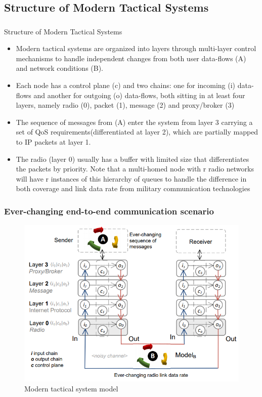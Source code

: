 \documentclass{beamer}
\begin{document}
\subsection*{Structure of Modern Tactical Systems}
\begin{frame}[fragile]
\frametitle{}
\begin{block}{Structure of Modern Tactical Systems}
\begin{itemize}
    \item Modern tactical systems are organized into layers through multi-layer control mechanisms to handle independent changes from both user data-flows (A) and network conditions (B).
    \item  Each node has a control plane (c) and two chains: one for incoming (i) data-flows and another for outgoing (o) data-flows, both sitting in at least four layers, namely radio (0), packet (1), message (2) and proxy/broker (3)
    \item The sequence of messages from (A) enter the system from layer 3 carrying a set of QoS requirements(differentiated at layer 2), which are partially mapped to IP packets at layer 1.
    \item The radio (layer 0) usually has a buffer with limited size that differentiates the packets by priority. Note that a multi-homed node with r radio networks will have r instances of this hierarchy of queues to handle the difference in both coverage and link data rate from military communication technologies
\end{itemize}
\end{block}
\end{frame}
\begin{frame}[fragile]
\frametitle{Ever-changing end-to-end communication scenario}
\begin{figure}
    \includegraphics[scale=0.69]{research-paper-image.PNG}
    \caption{Modern tactical system model}
\end{figure}

\end{frame}
\end{document}
